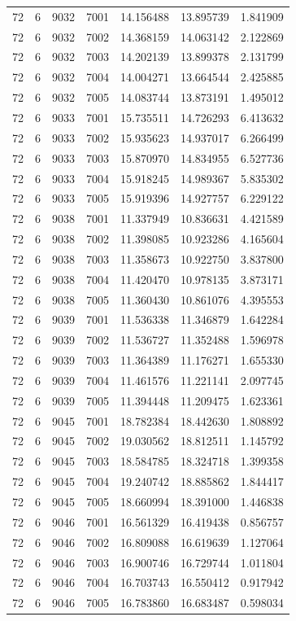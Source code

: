 \begin{table}
\begin{tabular}{rrrrrrr}
72 & 6 & 9032 & 7001 & 14.156488 & 13.895739 & 1.841909 \\
72 & 6 & 9032 & 7002 & 14.368159 & 14.063142 & 2.122869 \\
72 & 6 & 9032 & 7003 & 14.202139 & 13.899378 & 2.131799 \\
72 & 6 & 9032 & 7004 & 14.004271 & 13.664544 & 2.425885 \\
72 & 6 & 9032 & 7005 & 14.083744 & 13.873191 & 1.495012 \\
72 & 6 & 9033 & 7001 & 15.735511 & 14.726293 & 6.413632 \\
72 & 6 & 9033 & 7002 & 15.935623 & 14.937017 & 6.266499 \\
72 & 6 & 9033 & 7003 & 15.870970 & 14.834955 & 6.527736 \\
72 & 6 & 9033 & 7004 & 15.918245 & 14.989367 & 5.835302 \\
72 & 6 & 9033 & 7005 & 15.919396 & 14.927757 & 6.229122 \\
72 & 6 & 9038 & 7001 & 11.337949 & 10.836631 & 4.421589 \\
72 & 6 & 9038 & 7002 & 11.398085 & 10.923286 & 4.165604 \\
72 & 6 & 9038 & 7003 & 11.358673 & 10.922750 & 3.837800 \\
72 & 6 & 9038 & 7004 & 11.420470 & 10.978135 & 3.873171 \\
72 & 6 & 9038 & 7005 & 11.360430 & 10.861076 & 4.395553 \\
72 & 6 & 9039 & 7001 & 11.536338 & 11.346879 & 1.642284 \\
72 & 6 & 9039 & 7002 & 11.536727 & 11.352488 & 1.596978 \\
72 & 6 & 9039 & 7003 & 11.364389 & 11.176271 & 1.655330 \\
72 & 6 & 9039 & 7004 & 11.461576 & 11.221141 & 2.097745 \\
72 & 6 & 9039 & 7005 & 11.394448 & 11.209475 & 1.623361 \\
72 & 6 & 9045 & 7001 & 18.782384 & 18.442630 & 1.808892 \\
72 & 6 & 9045 & 7002 & 19.030562 & 18.812511 & 1.145792 \\
72 & 6 & 9045 & 7003 & 18.584785 & 18.324718 & 1.399358 \\
72 & 6 & 9045 & 7004 & 19.240742 & 18.885862 & 1.844417 \\
72 & 6 & 9045 & 7005 & 18.660994 & 18.391000 & 1.446838 \\
72 & 6 & 9046 & 7001 & 16.561329 & 16.419438 & 0.856757 \\
72 & 6 & 9046 & 7002 & 16.809088 & 16.619639 & 1.127064 \\
72 & 6 & 9046 & 7003 & 16.900746 & 16.729744 & 1.011804 \\
72 & 6 & 9046 & 7004 & 16.703743 & 16.550412 & 0.917942 \\
72 & 6 & 9046 & 7005 & 16.783860 & 16.683487 & 0.598034 \\
\bottomrule
\end{tabular}
\end{table}
